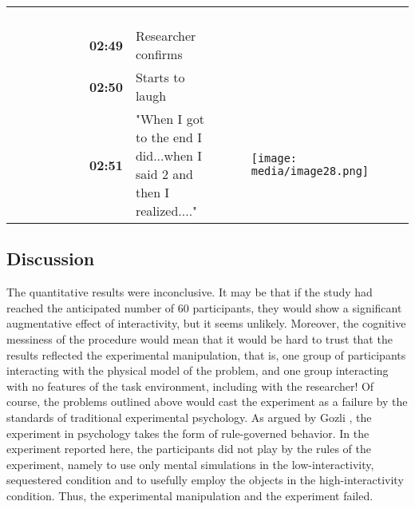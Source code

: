 \documentclass{article}
\begin{document}
\begin{table}
\begin{tabular}{l  l  l  l}
\begin{figure}
\end{figure}
\\
 & \textbf{02:49} & Researcher confirms & \\
 & \textbf{02:50} & Starts to laugh & \\
 & \textbf{02:51} & "When I got to the end I did...when I said 2 and then I realized...." & 
\begin{figure}

  \texttt{[image: media/image28.png]}
\caption{}
\label{}


\end{figure}
\\


\end{tabular}


\end{table}
\subsection{}

\subsection{Discussion}

The quantitative results were inconclusive. It may be that if the study had reached the anticipated number of 60 participants, they would show a significant augmentative effect of interactivity, but it seems unlikely. Moreover, the cognitive messiness of the procedure would mean that it would be hard to trust that the results reflected the experimental manipulation, that is, one group of participants interacting with the physical model of the problem, and one group interacting with no features of the task environment, including with the researcher! Of course, the problems outlined above would cast the experiment as a failure by the standards of traditional experimental psychology. As argued by Gozli \parencite{Gozli2017}, the experiment in psychology takes the form of rule-governed behavior. In the experiment reported here, the participants did not play by the rules of the experiment, namely to use only mental simulations in the low-interactivity, sequestered condition and to usefully employ the objects in the high-interactivity condition. Thus, the experimental manipulation and the experiment failed. 
\end{document}
